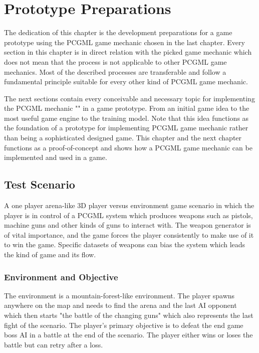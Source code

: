 \documentclass[MGS,Master,english]{twbook}%
\begin{document}
%
%
\clearpage
\chapter{Prototype Preparations} \label{chapter::gamePrototype}
The dedication of this chapter is the development preparations for a game prototype using the \ac{PCGML} game mechanic chosen in the last chapter. Every section in this chapter is in direct relation with the picked game mechanic which does not mean that the process is not applicable to other \ac{PCGML} game mechanics. Most of the described processes are transferable and follow a fundamental principle suitable for every other kind of \ac{PCGML} game mechanic. 

The next sections contain every conceivable and necessary topic for implementing the \ac{PCGML} mechanic "" in a game prototype. From an initial game idea to the most useful game engine to the training model. Note that this idea functions as the foundation of a prototype for implementing \ac{PCGML} game mechanic rather than being a sophisticated designed game. This chapter and the next chapter functions as a proof-of-concept and shows how a \ac{PCGML} game mechanic can be implemented and used in a game.

\section{Test Scenario}
A one player arena-like \ac{3D} player versus environment game scenario in which the player is in control of a \ac{PCGML} system which produces weapons such as pistols, machine guns and other kinds of guns to interact with. The weapon generator is of vital importance, and the game forces the player consistently to make use of it to win the game. Specific datasets of weapons can bias the system which leads the kind of game and its flow. 

\subsection{Environment and Objective}
The environment is a mountain-forest-like environment. The player spawns anywhere on the map and needs to find the arena and the last \ac{AI} opponent which then starts "the battle of the changing guns" which also represents the last fight of the scenario. The player's primary objective is to defeat the end game boss \ac{AI} in a battle at the end of the scenario. The player either wins or loses the battle but can retry after a loss.
\end{document}
